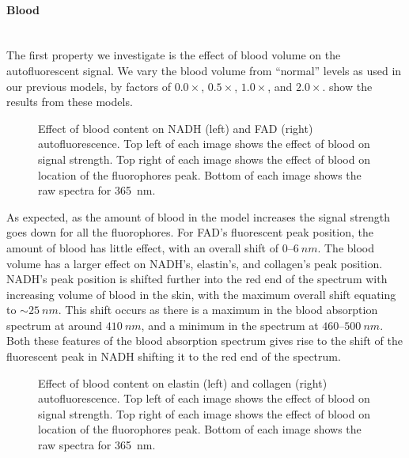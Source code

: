 \paragraph*{Blood}\hspace{0pt}\\
The first property we investigate is the effect of blood volume on the autofluorescent signal.
We vary the blood volume from ``normal'' levels as used in our previous models, by factors of $0.0\times$, $0.5\times$, $1.0\times$, and $2.0\times$.
 show the results from these models.

\begin{figure}[!htbp]
    \centering
    \caption{Effect of blood content on NADH (left) and FAD (right) autofluorescence. Top left of each image shows the effect of blood on signal strength. Top right of each image shows the effect of blood on location of the fluorophores peak. Bottom of each image shows the raw spectra for 365~nm.}%
    \label{fig:nadhfad-blood}%
\end{figure}

As expected, as the amount of blood in the model increases the signal strength goes down for all the fluorophores.
For FAD's fluorescent peak position, the amount of blood has little effect, with an overall shift of $0$--$6~nm$.
The blood volume has a larger effect on NADH's, elastin's, and collagen's peak position.
NADH's peak position is shifted further into the red end of the spectrum with increasing volume of blood in the skin, with the maximum overall shift equating to $\sim25~nm$.
This shift occurs as there is a maximum in the blood absorption spectrum at around $410~nm$, and a minimum in the spectrum at $460$--$500~nm$.
Both these features of the blood absorption spectrum gives rise to the shift of the fluorescent peak in NADH shifting it to the red end of the spectrum.

\begin{figure}[!htbp]
    \centering
    \caption{Effect of blood content on elastin (left) and collagen (right) autofluorescence. Top left of each image shows the effect of blood on signal strength. Top right of each image shows the effect of blood on location of the fluorophores peak. Bottom of each image shows the raw spectra for 365~nm.}%
    \label{fig:elscol-blood}%
\end{figure}

